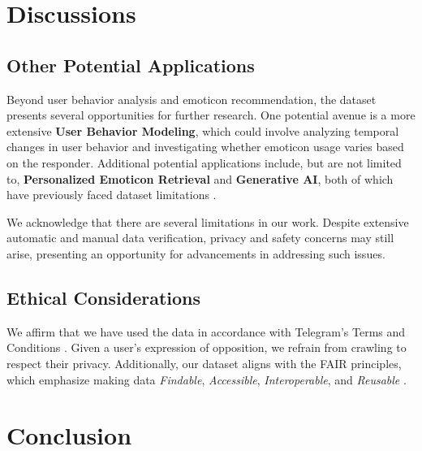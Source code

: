 \section{Discussions}

\subsection{Other Potential Applications}
Beyond user behavior analysis and emoticon recommendation, the dataset presents several opportunities for further research. One potential avenue is a more extensive \textbf{User Behavior Modeling}, which could involve analyzing temporal changes in user behavior and investigating whether emoticon usage varies based on the responder. Additional potential applications include, but are not limited to, \textbf{Personalized Emoticon Retrieval} and \textbf{Generative AI}, both of which have previously faced dataset limitations \cite{pmg, pigeon}.

We acknowledge that there are several limitations in our work. Despite extensive automatic and manual data verification, privacy and safety concerns may still arise, presenting an opportunity for advancements in addressing such issues.

\subsection{Ethical Considerations}
We affirm that we have used the data in accordance with Telegram's Terms and Conditions \cite{telegram_tos}. Given a user's expression of opposition, we refrain from crawling to respect their privacy. Additionally, our dataset aligns with the FAIR principles, which emphasize making data \textit{Findable}, \textit{Accessible}, \textit{Interoperable}, and \textit{Reusable} \cite{fair_principles}.


\section{Conclusion}


